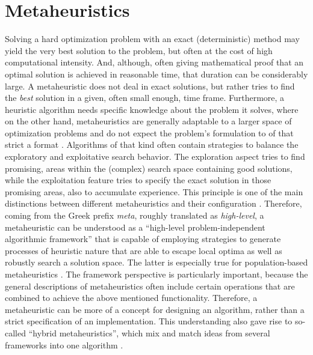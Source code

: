\section{Metaheuristics}
\label{chap:meta}

Solving a hard optimization problem with an exact (deterministic) method may yield the very best solution to the problem, but often at the cost of high computational intensity. And, although, often giving mathematical proof that an optimal solution is achieved in reasonable time, that duration can be considerably large. A metaheuristic does not deal in exact solutions, but rather tries to find the \textit{best} solution in a given, often small enough, time frame. 
Furthermore, a heuristic algorithm needs specific knowledge about the problem it solves, where on the other hand, metaheuristics are generally adaptable to a larger space of optimization problems and do not expect the problem's formulation to of that strict a format \cite{sorensen2013metaheuristics}. 
Algorithms of that kind often contain strategies to balance the exploratory and exploitative search behavior. The exploration aspect tries to find promising, areas within the (complex) search space containing good solutions, while the exploitation feature tries to specify the exact solution in those promising areas, also to accumulate experience. This principle is one of the main distinctions between different metaheuristics and their configuration \cite{boussaid2013survey}.
Therefore, coming from the Greek prefix \textit{meta}, roughly translated as \textit{high-level}, a metaheuristic can be understood as a \enquote{high-level problem-independent algorithmic framework} \cite{sorensen2013metaheuristics} that is capable of employing strategies to generate processes of heuristic nature that are able to escape local optima as well as robustly search a solution space. The latter is especially true for population-based metaheuristics \cite{gendreau2010handbook}. 
The framework perspective is particularly important, because the general descriptions of metaheuristics often include certain operations that are combined to achieve the above mentioned functionality. Therefore, a metaheuristic can be more of a concept for designing an algorithm, rather than a strict specification of an implementation. This understanding also gave rise to so-called \enquote{hybrid metaheuristics}, which mix and match ideas from several frameworks into one algorithm \cite{sorensen2018history}.

